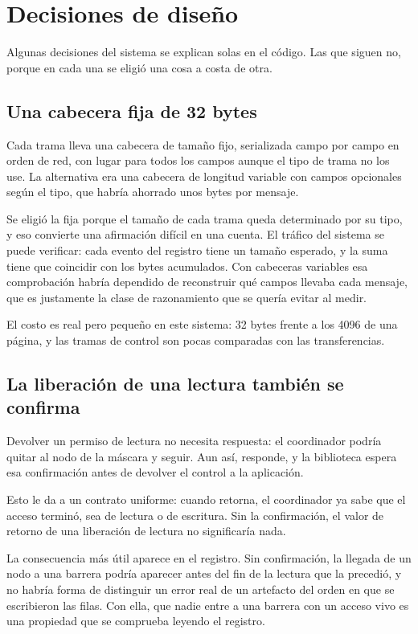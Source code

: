 \section{Decisiones de diseño}

Algunas decisiones del sistema se explican solas en el código. Las que siguen
no, porque en cada una se eligió una cosa a costa de otra.

\subsection{Una cabecera fija de 32 bytes}

Cada trama lleva una cabecera de tamaño fijo, serializada campo por campo en
orden de red, con lugar para todos los campos aunque el tipo de trama no los
use. La alternativa era una cabecera de longitud variable con campos
opcionales según el tipo, que habría ahorrado unos bytes por mensaje.

Se eligió la fija porque el tamaño de cada trama queda determinado por su
tipo, y eso convierte una afirmación difícil en una cuenta. El tráfico del
sistema se puede verificar: cada evento del registro tiene un tamaño esperado,
y la suma tiene que coincidir con los bytes acumulados. Con cabeceras
variables esa comprobación habría dependido de reconstruir qué campos llevaba
cada mensaje, que es justamente la clase de razonamiento que se quería evitar
al medir.

El costo es real pero pequeño en este sistema: 32 bytes frente a los 4096 de
una página, y las tramas de control son pocas comparadas con las
transferencias.

\subsection{La liberación de una lectura también se confirma}

Devolver un permiso de lectura no necesita respuesta: el coordinador podría
quitar al nodo de la máscara y seguir. Aun así, responde, y la biblioteca
espera esa confirmación antes de devolver el control a la aplicación.

Esto le da a  un contrato uniforme: cuando retorna, el
coordinador ya sabe que el acceso terminó, sea de lectura o de escritura. Sin
la confirmación, el valor de retorno de una liberación de lectura no
significaría nada.

La consecuencia más útil aparece en el registro. Sin confirmación, la llegada
de un nodo a una barrera podría aparecer antes del fin de la lectura que la
precedió, y no habría forma de distinguir un error real de un artefacto del
orden en que se escribieron las filas. Con ella, que nadie entre a una barrera
con un acceso vivo es una propiedad que se comprueba leyendo el registro.

